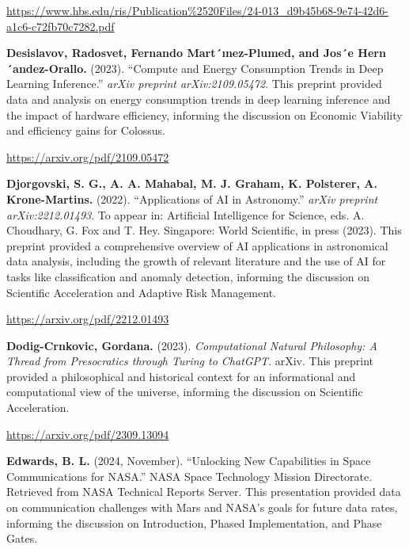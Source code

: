 \documentclass[fontsize=10pt, oneside, DIV=calc]{scrartcl}
\begin{document}
\href{https://www.hbs.edu/ris/Publication\%2520Files/24-013\_d9b45b68-9e74-42d6-a1c6-c72fb70c7282.pdf}{\url{https://www.hbs.edu/ris/Publication\%2520Files/24-013\_d9b45b68-9e74-42d6-a1c6-c72fb70c7282.pdf}}

\vspace{1em}
\noindent \textbf{Desislavov, Radosvet, Fernando Mart´ınez-Plumed, and Jos´e Hern´andez-Orallo.} (2023). ``Compute and Energy Consumption Trends in Deep Learning Inference.'' \textit{arXiv preprint arXiv:2109.05472}. This preprint provided data and analysis on energy consumption trends in deep learning inference and the impact of hardware efficiency, informing the discussion on Economic Viability and efficiency gains for Colossus. 



\href{https://arxiv.org/pdf/2109.05472}{\url{https://arxiv.org/pdf/2109.05472}}

\vspace{1em}
\noindent \textbf{Djorgovski, S. G., A. A. Mahabal, M. J. Graham, K. Polsterer, A. Krone-Martins.} (2022). ``Applications of AI in Astronomy.'' \textit{arXiv preprint arXiv:2212.01493}. To appear in: Artificial Intelligence for Science, eds. A. Choudhary, G. Fox and T. Hey. Singapore: World Scientific, in press (2023). This preprint provided a comprehensive overview of AI applications in astronomical data analysis, including the growth of relevant literature and the use of AI for tasks like classification and anomaly detection, informing the discussion on Scientific Acceleration and Adaptive Risk Management. 



\href{https://arxiv.org/pdf/2212.01493}{\url{https://arxiv.org/pdf/2212.01493}}

\vspace{1em}
\noindent \textbf{Dodig-Crnkovic, Gordana.} (2023). \textit{Computational Natural Philosophy: A Thread from Presocratics through Turing to ChatGPT}. arXiv. This preprint provided a philosophical and historical context for an informational and computational view of the universe, informing the discussion on Scientific Acceleration. 



\href{https://arxiv.org/pdf/2309.13094}{\url{https://arxiv.org/pdf/2309.13094}}

\vspace{1em}
\noindent \textbf{Edwards, B. L.} (2024, November). ``Unlocking New Capabilities in Space Communications for NASA.'' NASA Space Technology Mission Directorate. Retrieved from NASA Technical Reports Server. This presentation provided data on communication challenges with Mars and NASA's goals for future data rates, informing the discussion on Introduction, Phased Implementation, and Phase Gates. 
\end{document}
